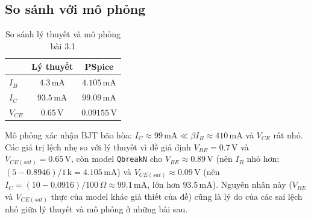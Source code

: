 \subsection{So sánh với mô phỏng}
\begin{table}[H]
\centering
\begin{tabular}{l|c|c}
\toprule
 & Lý thuyết & PSpice \\
\midrule
$I_B$ & $4.3\,\text{mA}$ & $4.105\,\text{mA}$ \\
$I_C$ & $93.5\,\text{mA}$ & $99.09\,\text{mA}$ \\
$V_{CE}$ & $0.65\,\text{V}$ & $0.09155\,\text{V}$ \\
\bottomrule
\end{tabular}
\caption{So sánh lý thuyết và mô phỏng bài 3.1}
\end{table}
Mô phỏng xác nhận BJT bão hòa: $I_C \approx 99\,\text{mA} \ll \beta I_B \approx 410\,\text{mA}$ và $V_{CE}$ rất nhỏ. Các giá trị lệch nhẹ so với lý thuyết vì đề giả định $V_{BE} = 0.7\,\text{V}$ và $V_{CE(sat)} = 0.65\,\text{V}$, còn model \texttt{QbreakN} cho $V_{BE} \approx 0.89\,\text{V}$ (nên $I_B$ nhỏ hơn: $(5-0.8946)/1\,\text{k} = 4.105\,\text{mA}$) và $V_{CE(sat)} \approx 0.09\,\text{V}$ (nên $I_C = (10-0.0916)/100\,\Omega \approx 99.1\,\text{mA}$, lớn hơn $93.5\,\text{mA}$). Nguyên nhân này ($V_{BE}$ và $V_{CE(sat)}$ thực của model khác giả thiết của đề) cũng là lý do của các sai lệch nhỏ giữa lý thuyết và mô phỏng ở những bài sau.
